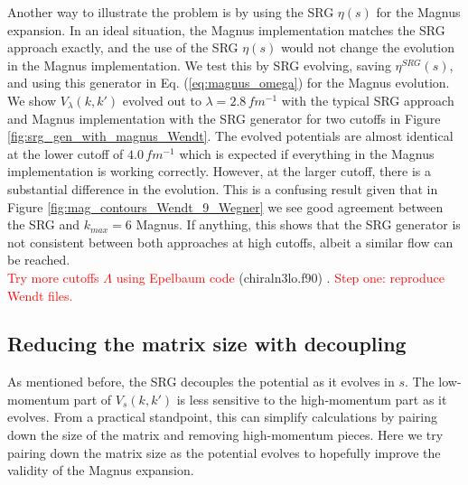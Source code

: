 \documentclass[preprintnumbers,floatfix,aps,prc,preprint]{revtex4-1}
\begin{document}
%
Another way to illustrate the problem is by using the SRG $\eta(s)$ for the Magnus expansion. In an ideal situation, the Magnus implementation matches the SRG approach exactly, and the use of the SRG $\eta(s)$ would not change the evolution in the Magnus implementation. We test this by SRG evolving, saving $\eta^{SRG}(s)$, and using this generator in Eq. (\ref{eq:magnus_omega}) for the Magnus evolution. We show $V_{\lambda}(k,k')$ evolved out to $\lambda=2.8 \, fm^{-1}$ with the typical SRG approach and Magnus implementation with the SRG generator for two cutoffs in Figure \ref{fig:srg_gen_with_magnus_Wendt}. The evolved potentials are almost identical at the lower cutoff of $4.0 \, fm^{-1}$ which is expected if everything in the Magnus implementation is working correctly. However, at the larger cutoff, there is a substantial difference in the evolution. This is a confusing result given that in Figure \ref{fig:mag_contours_Wendt_9_Wegner} we see good agreement between the SRG and $k_{max}=6$ Magnus. If anything, this shows that the SRG generator is not consistent between both approaches at high cutoffs, albeit a similar flow can be reached. \\

\textcolor{red}{Try more cutoffs $\Lambda$ using Epelbaum code} (chiraln3lo.f90) \cite{Epelbaum:2005}. \textcolor{red}{Step one: reproduce Wendt files.}

\subsection{Reducing the matrix size with decoupling}

As mentioned before, the SRG decouples the potential as it evolves in $s$. The low-momentum part of $V_s(k,k')$ is less sensitive to the high-momentum part as it evolves. From a practical standpoint, this can simplify calculations by pairing down the size of the matrix and removing high-momentum pieces. Here we try pairing down the matrix size as the potential evolves to hopefully improve the validity of the Magnus expansion. \\
\end{document}
